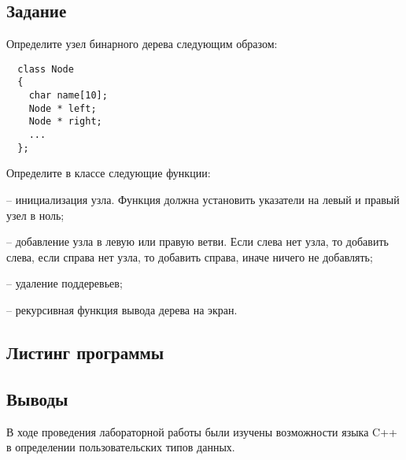 \documentclass[a4paper,12pt]{article}
\begin{document}
\subsection{Задание}

Определите узел бинарного дерева следующим образом:

\begin{lstlisting}
  class Node
  {
    char name[10];	
    Node * left;	
    Node * right;	
    ...
  };
\end{lstlisting}

Определите в классе следующие функции:

\small{} -- инициализация узла. Функция должна установить указатели на левый и правый узел в ноль;

\small{} -- добавление узла в левую или правую ветви. Если слева нет узла, то добавить слева, если справа нет узла, то добавить справа, иначе ничего не добавлять;

\small{} -- удаление поддеревьев;

\small{} -- рекурсивная функция вывода дерева на экран.

\subsection{Листинг программы}





\subsection{Выводы}

В ходе проведения лабораторной работы были изучены возможности языка C++ в определении пользовательских типов данных.
\end{document}
